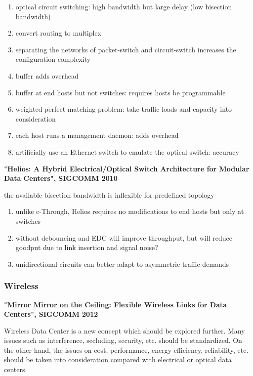 \documentclass[journal,onecolumn,11pt]{IEEEtran}
\begin{document}
\begin{enumerate}
  \item optical circuit switching: high bandwidth but large delay (low bisection bandwidth)
  \item convert routing to multiplex
  \item separating the networks of packet-switch and circuit-switch increases the configuration complexity
  \item buffer adds overhead
  \item buffer at end hosts but not switches: requires hosts be programmable
  \item weighted perfect matching problem: take traffic loads and capacity into consideration
  \item each host runs a management daemon: adds overhead
  \item artificially use an Ethernet switch to emulate the optical switch: accuracy
\end{enumerate}

\textbf{"Helios: A Hybrid Electrical/Optical Switch Architecture for Modular Data Centers", SIGCOMM 2010}

the available bisection bandwidth is inflexible for predefined topology

\begin{enumerate}
  \item unlike c-Through, Helios requires no modifications to end hosts but only at switches
  \item without debouncing and EDC will improve throughput, but will reduce goodput due to link insertion and signal noise?
  \item unidirectional circuits can better adapt to asymmetric traffic demands
\end{enumerate}

\subsubsection{Wireless}

\textbf{"Mirror Mirror on the Ceiling: Flexible Wireless Links for Data Centers", SIGCOMM 2012}

Wireless Data Center is a new concept which should be explored further. Many issues such as interference, secluding, security, etc. should be standardized. On the other hand, the issues on cost, performance, energy-efficiency, reliability, etc. should be taken into consideration compared with electrical or optical data centers.
\end{document}
